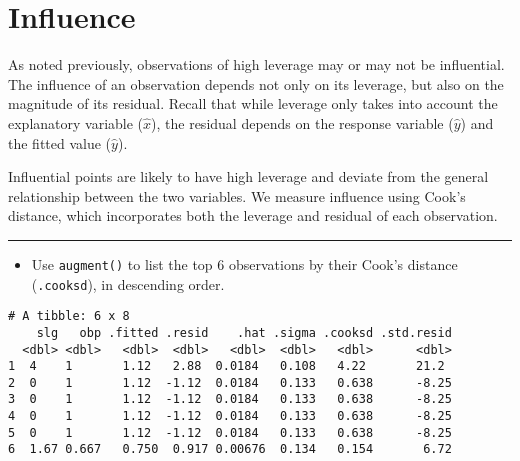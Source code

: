 \documentclass[
]{book}
\newenvironment{Shaded}{\begin{snugshade}}{\end{snugshade}}
\newcommand{\CommentTok}[1]{\textcolor[rgb]{0.56,0.35,0.01}{\textit{#1}}}
\newcommand{\KeywordTok}[1]{\textcolor[rgb]{0.13,0.29,0.53}{\textbf{#1}}}
\newcommand{\NormalTok}[1]{#1}
\newcommand{\OperatorTok}[1]{\textcolor[rgb]{0.81,0.36,0.00}{\textbf{#1}}}
\newcommand{\StringTok}[1]{\textcolor[rgb]{0.31,0.60,0.02}{#1}}
\providecommand{\tightlist}{%
  \setlength{\itemsep}{0pt}\setlength{\parskip}{0pt}}
\begin{document}
\hypertarget{influence}{%
\section{Influence}\label{influence}}

As noted previously, observations of high leverage may or may not be influential. The influence of an observation depends not only on its leverage, but also on the magnitude of its residual. Recall that while leverage only takes into account the explanatory variable (\(\hat{x}\)), the residual depends on the response variable (\(\hat{y}\)) and the fitted value (\(\hat{y}\)).

Influential points are likely to have high leverage and deviate from the general relationship between the two variables. We measure influence using Cook's distance, which incorporates both the leverage and residual of each observation.

\begin{center}\rule{0.5\linewidth}{0.5pt}\end{center}

\begin{itemize}
\tightlist
\item
  Use \texttt{augment()} to list the top 6 observations by their Cook's distance (\texttt{.cooksd}), in descending order.
\end{itemize}

\begin{Shaded}
\end{Shaded}

\begin{verbatim}
# A tibble: 6 x 8
    slg   obp .fitted .resid    .hat .sigma .cooksd .std.resid
  <dbl> <dbl>   <dbl>  <dbl>   <dbl>  <dbl>   <dbl>      <dbl>
1  4    1       1.12   2.88  0.0184   0.108   4.22       21.2 
2  0    1       1.12  -1.12  0.0184   0.133   0.638      -8.25
3  0    1       1.12  -1.12  0.0184   0.133   0.638      -8.25
4  0    1       1.12  -1.12  0.0184   0.133   0.638      -8.25
5  0    1       1.12  -1.12  0.0184   0.133   0.638      -8.25
6  1.67 0.667   0.750  0.917 0.00676  0.134   0.154       6.72
\end{verbatim}
\end{document}
